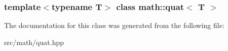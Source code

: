 \subsubsection*{template$<$typename T$>$ class math::quat$<$ T $>$}



The documentation for this class was generated from the following file:\begin{DoxyCompactItemize}
\item 
src/math/quat.hpp\end{DoxyCompactItemize}
